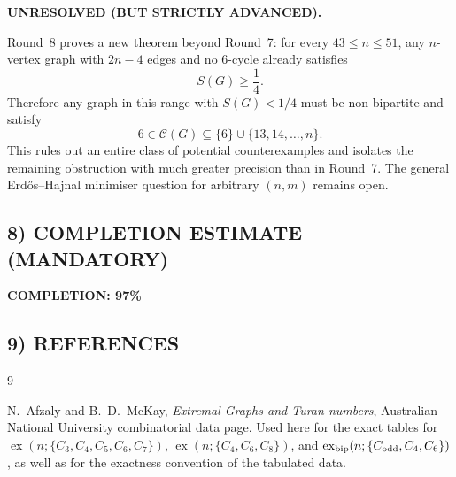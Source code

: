 \textbf{UNRESOLVED (BUT STRICTLY ADVANCED).}

Round~8 proves a new theorem beyond Round~7:
for every $43\le n\le 51$, any $n$-vertex graph with $2n-4$ edges and no $6$-cycle already satisfies
\[
S(G)\ge \frac14.
\]
Therefore any graph in this range with $S(G)<1/4$ must be non-bipartite and satisfy
\[
6\in\mathcal C(G)\subseteq \{6\}\cup\{13,14,\dots,n\}.
\]
This rules out an entire class of potential counterexamples and isolates the remaining obstruction with much greater precision than in Round~7.
The general Erd\H{o}s--Hajnal minimiser question for arbitrary $(n,m)$ remains open.

\subsection*{8) COMPLETION ESTIMATE (MANDATORY)}

\textbf{COMPLETION: 97\%}

\subsection*{9) REFERENCES}

\begin{thebibliography}{9}

N.~Afzaly and B.~D.~McKay,
\emph{Extremal Graphs and Turan numbers},
Australian National University combinatorial data page.
Used here for the exact tables for
$\operatorname{ex}(n;\{C_3,C_4,C_5,C_6,C_7\})$,
$\operatorname{ex}(n;\{C_4,C_6,C_8\})$,
and
$\operatorname{ex}_{\rm bip}(n;\{C_{\mathrm{odd}},C_4,C_6\})$,
as well as for the exactness convention of the tabulated data.

\end{thebibliography}

